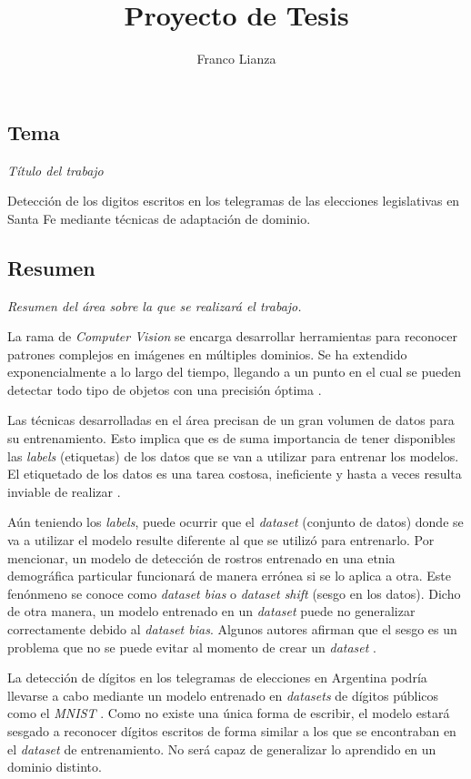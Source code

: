\documentclass[a4paper, twoside]{report}
\title{Proyecto de Tesis}
\author{Franco Lianza}
\begin{document}

\newpage

\subsection*{Tema}
{\it Título del trabajo}

Detecci\'on de los digitos escritos en los telegramas de las elecciones
legislativas en Santa Fe mediante t\'ecnicas de adaptaci\'on de dominio.

\subsection*{Resumen}
{\it Resumen del área sobre la que se realizará el trabajo.}

La rama de {\it Computer Vision} se encarga desarrollar herramientas para
reconocer patrones complejos en im\'agenes en m\'ultiples dominios. Se ha
extendido exponencialmente a lo largo del tiempo, llegando a un punto en el
cual se pueden detectar todo tipo de objetos con una precisi\'on \'optima
\cite{szeliski2010computer}.

Las t\'ecnicas desarrolladas en el \'area precisan de un gran volumen de datos
para su entrenamiento. Esto implica que es de suma importancia de tener
disponibles las {\it labels} (etiquetas) de los datos que se van a utilizar
para entrenar los modelos. El etiquetado de los datos es una tarea costosa,
ineficiente y hasta a veces resulta inviable de realizar \cite{reis2022data}.

A\'un teniendo los {\it labels}, puede ocurrir que el {\it dataset} (conjunto
de datos) donde se va a utilizar el modelo resulte diferente al que se utilizó
para entrenarlo. Por mencionar, un modelo de detecci\'on de rostros entrenado
en una etnia demogr\'afica particular funcionar\'a de manera err\'onea si se lo
aplica a otra. Este fen\'onmeno se conoce como {\it dataset bias} o {\it
		dataset shift} (sesgo en los datos). Dicho de otra manera, un modelo entrenado
en un {\it dataset} puede no generalizar correctamente debido al {\it dataset
		bias}. Algunos autores afirman que el sesgo es un problema que no se puede
evitar al momento de crear un {\it dataset} \cite{khosla2012undoing}.

La detecci\'on de d\'igitos en los telegramas de elecciones en Argentina
podr\'ia llevarse a cabo mediante un modelo entrenado en {\it datasets} de
d\'igitos p\'ublicos como el {\it MNIST} \cite{lecun1998gradient}. Como no
existe una \'unica forma de escribir, el modelo estar\'a sesgado a reconocer
d\'igitos escritos de forma similar a los que se encontraban en el {\it
		dataset} de entrenamiento. No ser\'a capaz de generalizar lo aprendido en un
dominio distinto.
\end{document}
